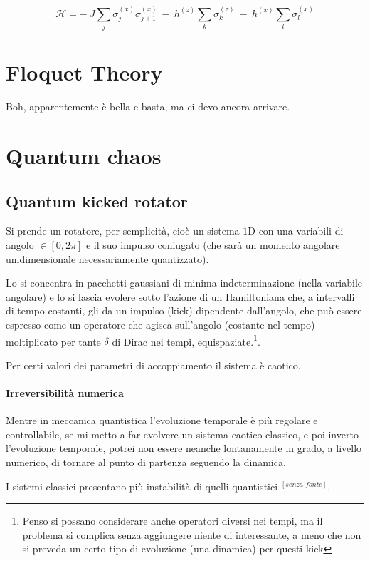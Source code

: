 \documentclass[a4paper,10pt]{article}
\begin{document}
\begin{equation}
\mathcal{H} = -~ J \sum_j \sigma_j^{(x)} \sigma_{j+1}^{(x)} ~-~ h^{(z)} \sum_k \sigma_k^{(z)} ~-~ h^{(x)} \sum_l \sigma_l^{(x)}
\end{equation}

\section{Floquet Theory}
Boh, apparentemente è bella e basta, ma ci devo ancora arrivare.

\section{Quantum chaos}

\subsection{Quantum kicked rotator} Si prende un rotatore, per semplicità, cioè un sistema $1$D con una variabili di angolo $\in [0,2\pi]$ e il suo impulso coniugato (che sarà un momento angolare unidimensionale necessariamente quantizzato).

Lo si concentra in pacchetti gaussiani di minima indeterminazione (nella variabile angolare) e lo si lascia evolere sotto l'azione di un Hamiltoniana che, a intervalli di tempo costanti, gli da un impulso (kick) dipendente dall'angolo, che può essere espresso come un operatore che agisca sull'angolo (costante nel tempo) moltiplicato per tante $\delta$ di Dirac nei tempi, equispaziate.\footnote{Penso si possano considerare anche operatori diversi nei tempi, ma il problema si complica senza aggiungere niente di interessante, a meno che non si preveda un certo tipo di evoluzione (una dinamica) per questi kick}.

Per certi valori dei parametri di accoppiamento il sistema è caotico.

\paragraph{Irreversibilità numerica} Mentre in meccanica quantistica l'evoluzione temporale è più regolare e controllabile, se mi metto a far evolvere un sistema caotico classico, e poi inverto l'evoluzione temporale, potrei non essere neanche lontanamente in grado, a livello numerico, di tornare al punto di partenza seguendo la dinamica.

I sistemi classici presentano più instabilità di quelli quantistici $^{[\textit{senza fonte}]}$.
\end{document}
